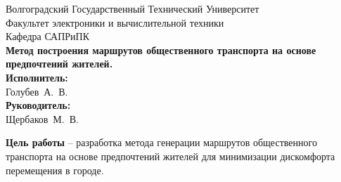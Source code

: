 
\begin{frame} %
    \begin{center}
        \small
        Волгоградский Государственный Технический Университет \\
        Факультет электроники и вычислительной техники \\
        Кафедра САПРиПК \\
        \vspace{1.5cm}
        \normalsize
        \textbf{Метод построения маршрутов общественного транспорта на основе 
        предпочтений жителей.}\\
        \vspace{1.0cm}
        \raggedleft\small
        \textbf{Исполнитель:}\\Голубев~А.~В.\\
        \textbf{Руководитель:}\\Щербаков~М.~В.\\
        \vspace{1.5cm}
        \vspace{\fill}
         \the\year
    \end{center}
\end{frame}

\begin{frame} %
    
\end{frame}

\begin{frame} %
    \textbf{Цель работы} -- разработка метода генерации маршрутов общественного 
    транспорта на основе предпочтений жителей для минимизации дискомфорта 
    перемещения в городе.
\end{frame}

